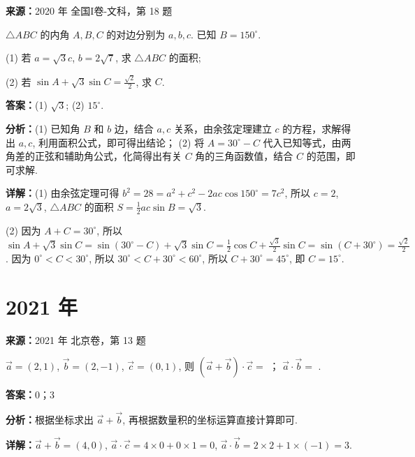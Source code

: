 \begin{question}[points=12]
\textbf{来源：}2020 年 全国I卷-文科，第 18 题\par
$\triangle ABC$ 的内角 $A, B, C$ 的对边分别为 $a, b, c$. 已知 $B=150^\circ$.



(1) 若 $a=\sqrt{3}c$, $b=2\sqrt{7}$, 求 $\triangle ABC$ 的面积;



(2) 若 $\sin A + \sqrt{3}\sin C = \frac{\sqrt{2}}{2}$, 求 $C$.
\begin{solution}
\textbf{答案：}(1) $\sqrt{3}$; (2) $15^\circ$.

\textbf{分析：}(1) 已知角 $B$ 和 $b$ 边，结合 $a,c$ 关系，由余弦定理建立 $c$ 的方程，求解得出 $a,c$, 利用面积公式，即可得出结论； (2) 将 $A=30^\circ - C$ 代入已知等式，由两角差的正弦和辅助角公式，化简得出有关 $C$ 角的三角函数值，结合 $C$ 的范围，即可求解.

\textbf{详解：}(1) 由余弦定理可得 $b^2 = 28 = a^2 + c^2 - 2ac\cos150^\circ = 7c^2$, 所以 $c=2$, $a=2\sqrt{3}$, $\triangle ABC$ 的面积 $S = \frac{1}{2}ac\sin B = \sqrt{3}$.

(2) 因为 $A+C=30^\circ$, 所以 $\sin A + \sqrt{3}\sin C = \sin(30^\circ - C) + \sqrt{3}\sin C = \frac{1}{2}\cos C + \frac{\sqrt{3}}{2}\sin C = \sin(C+30^\circ) = \frac{\sqrt{2}}{2}$. 因为 $0^\circ < C < 30^\circ$, 所以 $30^\circ < C+30^\circ < 60^\circ$, 所以 $C+30^\circ = 45^\circ$, 即 $C=15^\circ$.
\end{solution}
\end{question}

\section*{2021 年}

\begin{question}[points=5]
\textbf{来源：}2021 年 北京卷，第 13 题\par
$\vec{a}=(2,1)$, $\vec{b}=(2,-1)$, $\vec{c}=(0,1)$, 则 $(\vec{a}+\vec{b})\cdot\vec{c}=$ ； $\vec{a}\cdot\vec{b}=$ .
\fillin[{$0$；$3$}]
\begin{solution}
\textbf{答案：}$0$；$3$

\textbf{分析：}根据坐标求出 $\vec{a}+\vec{b}$, 再根据数量积的坐标运算直接计算即可.

\textbf{详解：}$\vec{a}+\vec{b}=(4,0)$, $\vec{a}\cdot\vec{c}=4\times0+0\times1=0$, $\vec{a}\cdot\vec{b}=2\times2+1\times(-1)=3$.
\end{solution}
\end{question}

